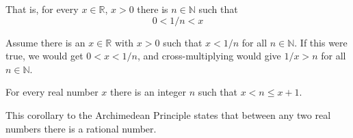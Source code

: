 \begin{cor-dan}
  That is, for every $x\in\mathbb{R}$, $x>0$ there is $n\in\mathbb{N}$ such that
  \begin{equation*}
  0<1/n<x
  \end{equation*}
\end{cor-dan}

\begin{proof-dan}
  Assume there is an $x\in\mathbb{R}$ with $x>0$ such that $x<1/n$ for all $n\in\mathbb{N}$.
  If this were true, we would get $0<x<1/n$, and cross-multiplying would give $1/x>n$ for all $n\in\mathbb{N}$.
\end{proof-dan}

\begin{cor-dan}
  For every real number $x$ there is an integer $n$ such that $x<n\leq x+1$.
\end{cor-dan}

\begin{proof-dan}
\end{proof-dan}

\begin{cor-dan}
   This corollary to the Archimedean Principle states that between any two real numbers there is a rational number.
\end{cor-dan}

